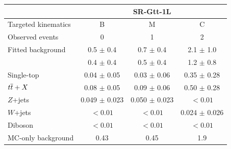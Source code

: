 \begin{table}[htbp]
	\centering	
	\renewcommand{\arraystretch}{1.0}
	\begin{tabular}{lccc}
	       \toprule
	       & \multicolumn{3}{c}{SR-Gtt-1L} \\
	       \midrule	
	        Targeted kinematics & B            &   M         &   C               \\[-0.05cm]
	       \midrule
	       Observed events              &  0   &  1 & 2  \\
	       \midrule
	       Fitted background             & 0.5 $\pm$ 0.4 & 0.7 $\pm$ 0.4 & 2.1 $\pm$ 1.0\\
	       \midrule
	       \ttbar\              &  0.4 $\pm$ 0.4 & 0.5 $\pm$ 0.4 & 1.2 $\pm$ 0.8\\
	       Single-top             & 0.04 $\pm$ 0.05 & 0.03 $\pm$ 0.06 & 0.35 $\pm$ 0.28\\
	       $t\overline{t}+X$          & 0.08 $\pm$ 0.05 & 0.09 $\pm$ 0.06 & 0.50 $\pm$ 0.28\\
	       $Z$+jets            & 0.049 $\pm$ 0.023 & 0.050 $\pm$ 0.023 & $<0.01$ \\
	       $W$+jets              & $<0.01$  & $<0.01$  & 0.024 $\pm$ 0.026\\
	       Diboson             & $<0.01$ & $<0.01$  & $<0.01$ \\
 	       \midrule
	       MC-only background &  0.43 & 0.45 & 1.9 \\
	       \bottomrule
	\end{tabular}

	\vspace{0.4cm}
	

\end{table}
